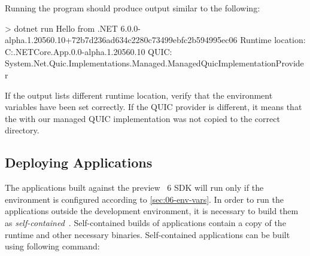 
Running the program should produce output similar to the following:

\noindent\begin{minipage}{\textwidth}
\begin{myVerbatim}
> dotnet run
Hello from .NET 6.0.0-alpha.1.20560.10+72b7d236ad634c2280c73499ebfc2b594995ec06
Runtime location: C:\dotnet\shared\Microsoft.NETCore.App\6.0.0-alpha.1.20560.10
QUIC: System.Net.Quic.Implementations.Managed.ManagedQuicImplementationProvider
\end{myVerbatim}
\end{minipage}\medskip

If the output lists different runtime location, verify that the environment variables have been set
correctly. If the QUIC provider is different, it means that the \SystemNetQuicDll{} with our managed
QUIC implementation was not copied to the correct directory.

\subsection{Deploying \dotnet{} Applications}

The applications built against the preview \dotnet{}~6 SDK will run only if the environment is
configured according to \autoref{sec:06-env-vars}. In order to run the applications outside the
development environment, it is necessary to build them as
\textit{self-contained}~\cite{SelfContainedPublishDocs}. Self-contained builds of \dotnet{}
applications contain a copy of the \dotnet{} runtime and other necessary binaries. Self-contained
applications can be built using following command:

